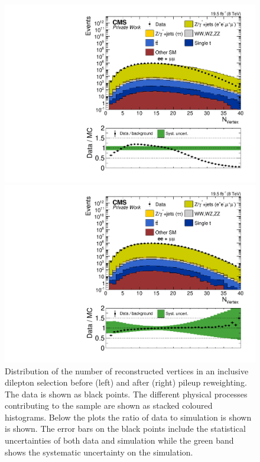 \begin{figure}[htbp]
\centering
\begin{minipage}[t]{0.49\textwidth}
  \includegraphics[width=\textwidth]{plots/SELECTION/Inclusive_nVtx_Full2012_SF_TopReweighted_NOPU.pdf}
\end{minipage}
\begin{minipage}[t]{0.49\textwidth}
\includegraphics[width=\textwidth]{plots/SELECTION/Inclusive_nVtx_Full2012_SF_TopReweighted.pdf}
\end{minipage}
\caption{Distribution of the number of reconstructed vertices in an inclusive dilepton selection before (left) and after (right) pileup reweighting. The data is shown as black points. The different physical processes contributing to the sample are shown as stacked coloured histograms. Below the plots the ratio of data to simulation is shown is shown. The error bars on the black points include the statistical uncertainties of both data and simulation while the green band shows the systematic uncertainty on the simulation. }
\label{fig:PU}
\end{figure}   

